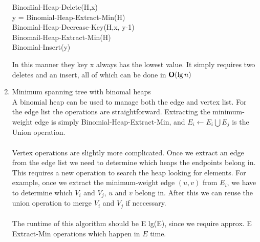 \documentclass[11pt,fleqn]{article}
\begin{document}
\begin{enumerate}
\begin{tabbing}

Bino\=mial-Heap-Delete(H,x) \\
	\>y = Binomial-Heap-Extract-Min(H) \\
	\>Binomial-Heap-Decrease-Key(H,x, y-1) \\
	\>Binomail-Heap-Extract-Min(H)\\
	\>Binomial-Insert(y) \\
\end{tabbing}
In this manner they key x always has the lowest value. It simply requires two deletes and an insert, all of which can be done in $\mbox{{\bfseries O}}(\lg{n})$

\item
Minimum spanning tree with binomal heaps\\
A binomial heap can be used to manage both the edge and vertex list. For the edge list the operations are straightforward. Extracting the minimum-weight edge is simply Binomial-Heap-Extract-Min, and $E_{i} \leftarrow E_{i} \bigcup E_{j}$ is the Union operation. \\
\\
Vertex operations are slightly more complicated. Once we extract an edge from the edge list we need to determine which heaps the endpoints belong in. This requires a new operation to search the heap looking for elements. For example, once we extract the minimum-weight edge $(u,v)$ from $E_{i}$, we have to determine which $V_{i}$ and $V_{j}$, $u$ and $v$ belong in. After this we can reuse the union operation to merge  $V_{i}$ and $V_{j}$ if neccessary. \\
\\
The runtime of this algorithm should be E lg(E), since we require approx. E Extract-Min operations which happen in $E$ time. 

\end{enumerate}
\end{document}
